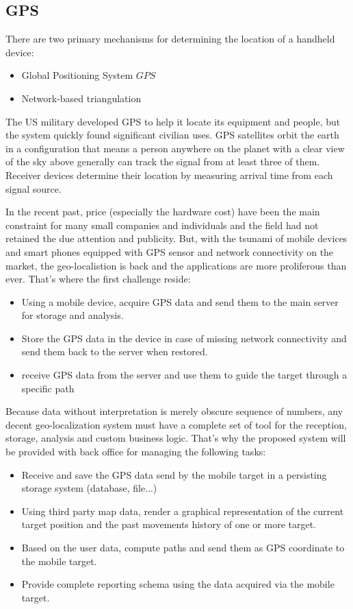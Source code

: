 \subsection{GPS}
There are two primary mechanisms for determining the location of a handheld
device:
\begin{itemize}
  \item Global Positioning System \(GPS\)
  \item Network-based triangulation
\end{itemize}

The US military developed GPS to help it locate its equipment and people, but the
system quickly found significant civilian uses. GPS satellites orbit the earth in
a configuration that means a person anywhere on the planet with a clear view of
the sky above generally can track the signal from at least three of them.
Receiver devices determine their location by measuring arrival time from each
signal source.

In the recent past, price (especially the hardware cost) have been the main
constraint for many small companies and individuals and the field had not
retained the due attention and publicity. But, with the tsunami of mobile
devices and smart phones equipped with GPS sensor and network connectivity on
the market, the geo-localistion is back and the applications are more
proliferous than ever. That's where the first challenge reside:
\begin{itemize}
\item Using a mobile device, acquire GPS data and send them to the main server
for storage and analysis.
\item Store the GPS data in the device in case of missing network connectivity
and send them back to the server when restored.
\item receive GPS data from the server and use them to guide the target through
a specific path
\end{itemize}

Because data without interpretation is merely obscure sequence of numbers, any
decent geo-localization system must have a complete set of tool for the
reception, storage, analysis and custom business logic. That's why the proposed
system will be provided with back office for managing the following tasks:
\begin{itemize}
\item Receive and save the GPS data send by the mobile target in a persisting
storage system (database, file...)
\item Using third party map data, render a graphical representation of the
current target position and the past movements history of one or more target.
\item Based on the user data, compute paths and send them as GPS coordinate to
the mobile target.
\item Provide complete reporting schema using the data acquired via the mobile
target.
\end{itemize}